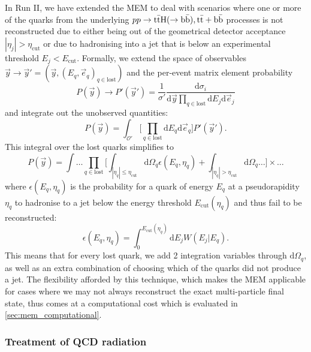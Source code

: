 In Run II, we have extended the MEM to deal with scenarios where one or more of the quarks from the underlying $pp \rightarrow \mathrm{t} \bar{\mathrm{t}} \mathrm{H}(\rightarrow \mathrm{b}\bar{\mathrm{b}}),\mathrm{t} \bar{\mathrm{t}} + \mathrm{b}\bar{\mathrm{b}}$ processes is not reconstructed due to either being out of the geometrical detector acceptance $|\eta_j| > \eta_{\mathrm{cut}}$ or due to hadronising into a jet that is below an experimental threshold $E_j < E_{\mathrm{cut}}$.
Formally, we extend the space of observables $\vec{y} \rightarrow \vec{y}' = (\vec{y}, (E_q, \vec{e}_q)_{q \in \mathrm{lost}})$ and the per-event matrix element probability
\begin{equation}
P(\vec{y}) \rightarrow P'(\vec{y}') = \frac{1}{\sigma'} \frac{\mathrm{d} \sigma_i}{\mathrm{d}\vec{y} \prod_{q\in\mathrm{lost}} \mathrm{d}E_j \mathrm{d}\vec{e}_j}
\end{equation}
and integrate out the unobserved quantities:
\begin{equation}
P(\vec{y}) = \int_{\mathcal{O}'} \bigl[ \prod_{q \in \mathrm{lost}} \mathrm{d}E_q \mathrm{d}\vec{e}_q \bigr] P'(\vec{y}').
\end{equation}
This integral over the lost quarks simplifies to
\begin{equation}
P(\vec{y}) = \int \dots \prod_{q\in\mathrm{lost}} \biggl[ \int_{|\eta_q| \leq \eta_{\mathrm{cut}}} \mathrm{d}\Omega_q \epsilon(E_q, \eta_q) + \int_{|\eta_q| > \eta_{\mathrm{cut}}} \mathrm{d}\Omega_q \dots \biggr] \times \dots
\end{equation}
where $\epsilon(E_q, \eta_q)$ is the probability for a quark of energy $E_q$ at a pseudorapidity $\eta_q$ to hadronise to a jet below the energy threshold $E_{\mathrm{cut}}(\eta_q)$ and thus fail to be reconstructed:
\begin{equation}
\epsilon(E_q, \eta_q) = \int_0^{E_{\mathrm{cut}}(\eta_q)} \mathrm{d}E_j W(E_j | E_q).
\end{equation}
This means that for every lost quark, we add 2 integration variables through $\mathrm{d}\Omega_q$, as well as an extra combination of choosing which of the quarks did not produce a jet. The flexibility afforded by this technique, which makes the MEM applicable for cases where we may not always reconstruct the exact multi-particle final state, thus comes at a computational cost which is evaluated in \cref{sec:mem_computational}.

\subsubsection{Treatment of QCD radiation}


